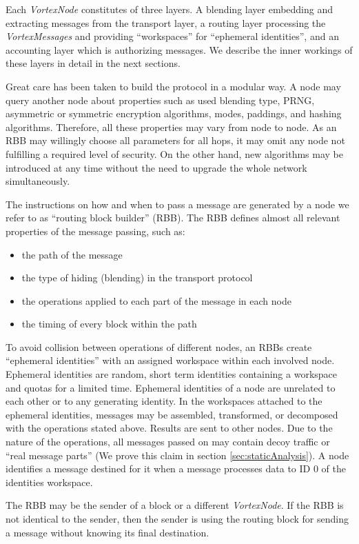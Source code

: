 \documentclass[acmsmall, screen, review]{acmart}
\begin{document}
Each \emph{VortexNode} constitutes of three layers. A blending layer embedding and extracting messages from the transport layer, a routing layer processing the \emph{VortexMessages} and providing ``workspaces'' for ``ephemeral identities'', and an accounting layer which is authorizing messages. We describe the inner workings of these layers in detail in the next sections.

Great care has been taken to build the protocol in a modular way. A node may query another node about properties such as used blending type, PRNG, asymmetric or symmetric encryption algorithms, modes, paddings, and hashing algorithms. Therefore, all these properties may vary from node to node. As an RBB may willingly choose all parameters for all hops, it may omit any node not fulfilling a required level of security. On the other hand, new algorithms may be introduced at any time without the need to upgrade the whole network simultaneously. 

The instructions on how and when to pass a message are generated by a node we refer to as ``routing block builder'' (RBB). The RBB defines almost all relevant properties of the message passing, such as: 
\begin{itemize}
	\item the path of the message
	\item the type of hiding (blending) in the transport protocol
	\item the operations applied to each part of the message in each node
	\item the timing of every block within the path
\end{itemize}

To avoid collision between operations of different nodes, an RBBs create ``ephemeral identities'' with an assigned workspace within each involved node. Ephemeral identities are random, short term identities containing a workspace and quotas for a limited time. Ephemeral identities of a node are unrelated to each other or to any generating identity. In the workspaces attached to the ephemeral identities, messages may be assembled, transformed, or decomposed with the operations stated above. Results are sent to other nodes. Due to the nature of the operations, all messages passed on may contain decoy traffic or ``real message parts'' (We prove this claim in section \ref{sec:staticAnalysis}). A node identifies a message destined for it when a message processes data to ID 0 of the identities workspace.

The RBB may be the sender of a block or a different \emph{VortexNode}. If the RBB is not identical to the sender, then the sender is using the routing block for sending a message without knowing its final destination.
\end{document}
